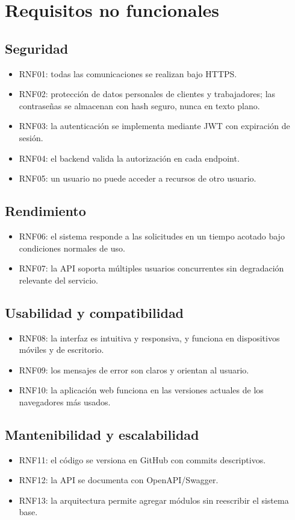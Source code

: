 \documentclass[11pt]{article}
\begin{document}
\section{Requisitos no funcionales}

\subsection{Seguridad}
\begin{itemize}
  \item RNF01: todas las comunicaciones se realizan bajo HTTPS.
  \item RNF02: protección de datos personales de clientes y trabajadores; las contraseñas se almacenan con hash seguro, nunca en texto plano.
  \item RNF03: la autenticación se implementa mediante JWT con expiración de sesión.
  \item RNF04: el backend valida la autorización en cada endpoint.
  \item RNF05: un usuario no puede acceder a recursos de otro usuario.
\end{itemize}

\subsection{Rendimiento}
\begin{itemize}
  \item RNF06: el sistema responde a las solicitudes en un tiempo acotado bajo condiciones normales de uso.
  \item RNF07: la API soporta múltiples usuarios concurrentes sin degradación relevante del servicio.
\end{itemize}

\subsection{Usabilidad y compatibilidad}
\begin{itemize}
  \item RNF08: la interfaz es intuitiva y responsiva, y funciona en dispositivos móviles y de escritorio.
  \item RNF09: los mensajes de error son claros y orientan al usuario.
  \item RNF10: la aplicación web funciona en las versiones actuales de los navegadores más usados.
\end{itemize}

\subsection{Mantenibilidad y escalabilidad}
\begin{itemize}
  \item RNF11: el código se versiona en GitHub con commits descriptivos.
  \item RNF12: la API se documenta con OpenAPI/Swagger.
  \item RNF13: la arquitectura permite agregar módulos sin reescribir el sistema base.
\end{itemize}
\end{document}
